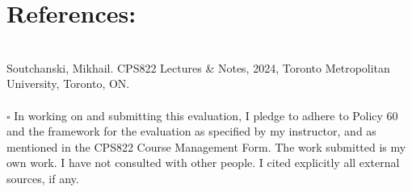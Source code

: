 \documentclass{assignment}
\begin{document}
\section*{References:}\\
Soutchanski, Mikhail. CPS822 Lectures \& Notes, 2024, Toronto Metropolitan University, Toronto, ON.\\

\hline
\hline
\text{}\\
\noindent $\square$	In working on and submitting this evaluation, I pledge to adhere to Policy 60 and 
the framework for the evaluation as specified by my instructor, and as mentioned in 
the CPS822 Course Management Form. The work submitted is my own work.  I have not consulted 
with other people. I cited explicitly all external sources, if any.
\end{document}
